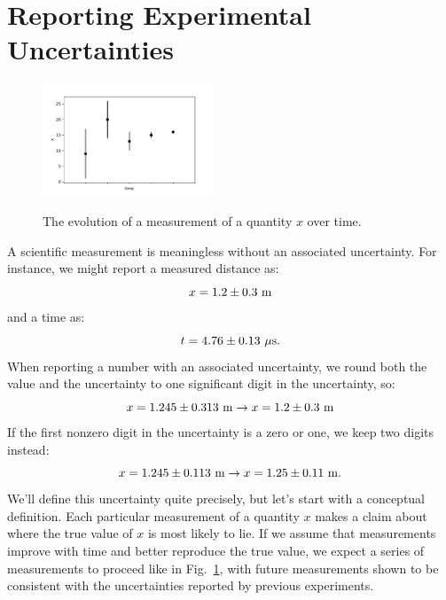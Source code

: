 \documentclass[12pt,oneside]{book}
\begin{document}
\section{Reporting Experimental Uncertainties}

\begin{figure}[htbp]
\begin{center}
{\includegraphics[width=0.45\textwidth]{figs/measuretime.pdf}}
\end{center}
\caption{\label{fig:measuretime}  The evolution of a measurement of a quantity $x$ over time.}
\end{figure}

A scientific measurement is meaningless without an associated uncertainty.   For instance, we might report a measured distance as:
\begin{displaymath}
x = 1.2 \pm 0.3~\rm m
\end{displaymath}
and a time as:
\begin{displaymath}
t = 4.76 \pm 0.13~\rm \mu s.
\end{displaymath}
When reporting a number with an associated uncertainty, we round both the value and the uncertainty to one significant digit in the uncertainty, so:
\begin{displaymath}
x = 1.245 \pm 0.313~{\rm m} \to x = 1.2 \pm 0.3~{\rm m} 
\end{displaymath}
If the first nonzero digit in the uncertainty is a zero or one, we keep two digits instead:
\begin{displaymath}
x = 1.245 \pm 0.113~{\rm m} \to x = 1.25 \pm 0.11~{\rm m}.
\end{displaymath}
We'll define this uncertainty quite precisely, but let's start with a conceptual definition.  Each particular measurement of a quantity $x$ makes a claim about where the true value of $x$ is most likely to lie.  If we assume that measurements improve with time and better reproduce the true value, we expect a series of measurements to proceed like in Fig.~\ref{fig:measuretime}, with future measurements shown to be consistent with the uncertainties reported by previous experiments.
\end{document}
